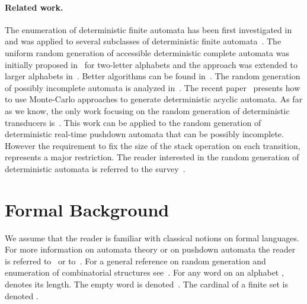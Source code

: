 \paragraph{Related work.}  The 
enumeration of deterministic finite automata has been first investigated
in~\cite{Vyssotsky} and was applied to several subclasses of deterministic
finite
automata~\cite{Korshunov,DBLP:journals/eik/Korshunov86,robinson,DBLP:journals/dam/Liskovets06}. 
The uniform random generation of accessible deterministic complete automata
was initially proposed in~\cite{thesecril} for two-letter alphabets and the
approach was extended to larger alphabets
in~\cite{DBLP:journals/tcs/ChamparnaudP05}. Better algorithms can be found
in~\cite{DBLP:journals/tcs/BassinoN07,DBLP:conf/stacs/CarayolN12}. The
random generation of possibly incomplete automata is analyzed
in~\cite{incomplet}. The recent paper~\cite{DBLP:conf/wia/CarninoF11}
presents how to use Monte-Carlo approaches to generate deterministic acyclic
automata. As far as we know, the only work focusing on the random generation
of deterministic transducers is~\cite{DBLP:journals/tcs/HeamNS10}. This work
can be applied to the random generation of deterministic real-time
pushdown automata that can be possibly incomplete. However the requirement to fix the size of the stack operation on each transition, represents a major restriction.
The reader interested in the random generation of deterministic automata is
 referred to the survey~\cite{DBLP:conf/mfcs/Nicaud14}. 






\section{Formal Background}\label{sec:bg}


We assume that the reader is familiar with classical notions on formal
languages. For more information on automata theory or on pushdown automata
the reader is referred to~\cite{Hopcroft} or to~\cite{Saka}. For a general
reference on random generation and enumeration of combinatorial structures
see~\cite{DBLP:journals/tcs/FlajoletZC94}. For any word  on an alphabet ,  denotes
its length. The empty word is denoted~.
The cardinal of a finite set  is denoted .

